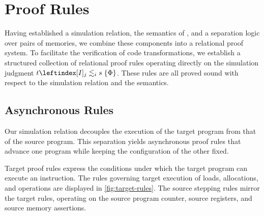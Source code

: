 \documentclass[report.tex]{subfiles}
\begin{document}
\section{\muRTL{} Proof Rules}

Having established a simulation relation,
the semantics of \muRTL{},
and a separation logic over pairs of memories,
we combine these components into a relational proof system.
To facilitate the verification of code transformations,
we establish a structured collection of relational proof rules
operating directly on the simulation judgment $\fsim{t}{j}{i}{s}{\Phi}$.
These rules are all proved sound with respect to the simulation relation
and the \muRTL{} semantics.

\subsection{Asynchronous Rules}

Our simulation relation decouples the execution of the target program
from that of the source program.
This separation yields asynchronous proof rules that advance one program
while keeping the configuration of the other fixed.

Target proof rules express the conditions under which the target program
can execute an instruction.
The rules governing target execution of loads, allocations, and operations
are displayed in \cref{fig:target-rules}.
The source stepping rules mirror the target rules,
operating on the source program counter,
source registers,
and source memory assertions.
\end{document}
